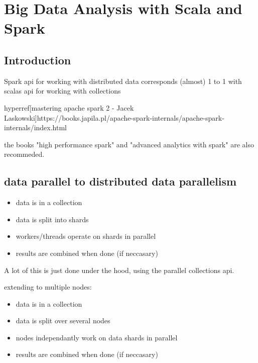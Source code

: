 \chapter{Big Data Analysis with Scala and Spark}

\section{Introduction}
Spark api for working with distributed data corresponds (almost) 1 to 1 with scalas api for working with collections

hyperref[mastering apache spark 2 - Jacek Laskowski]{https://books.japila.pl/apache-spark-internals/apache-spark-internals/index.html}

the books "high performance spark" and "advanced analytics with spark" are also recommeded.


\section{data parallel to distributed data parallelism}

\begin{itemize}
	\item data is in a collection
	\item data is split into shards
	\item workers/threads operate on shards in parallel
	\item results are combined when done (if neccasary)
\end{itemize}

A lot of this is just done under the hood, using the parallel collections api.

extending to multiple nodes:
\begin{itemize}
	\item data is in a collection
	\item data is split over several nodes
	\item nodes independantly work on data shards in parallel
	\item results are combined when done (if neccasary)
\end{itemize}